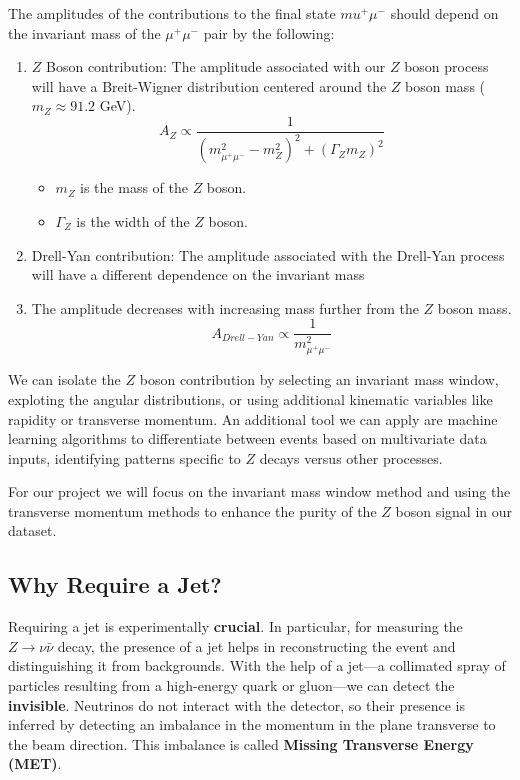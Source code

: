The amplitudes of the contributions to the final state \(mu^+ \mu^-\) should depend on the invariant mass of the $\mu^+ \mu^-$ pair by the following:
\begin{enumerate}
    \item $Z$ Boson contribution: The amplitude associated with our $Z$ boson process will have a Breit-Wigner distribution centered around the $Z$ boson mass ($m_Z \approx 91.2$ GeV).
    \begin{equation}
    A_{Z} \propto \frac{1}{(m^2_{\mu^+ \mu^-} - m^2_Z )^2 + (\Gamma_Z m_Z)^2} 
    \end{equation}
    \begin{itemize}[label=\(\ \star \)]
        \item $m_Z$ is the mass of the $Z$ boson.
        \item $\Gamma_Z$ is the width of the $Z$ boson.
    \end{itemize}
    \item Drell-Yan contribution: The amplitude associated with the Drell-Yan process will have a different dependence on the invariant mass
    \item The amplitude decreases with increasing mass further from the $Z$ boson mass.
    \begin{equation*}
        A_{Drell-Yan} \propto \frac{1}{m^2_{\mu^+ \mu^-}}
    \end{equation*}
\end{enumerate}

We can isolate the $Z$ boson contribution by selecting an invariant mass window, exploting the angular distributions, or using additional kinematic variables like rapidity or transverse momentum. An additional tool we can apply are machine learning algorithms to differentiate between events based on multivariate data inputs, identifying patterns specific to $Z$ decays versus other processes. 

For our project we will focus on the invariant mass window method and using the transverse momentum methods to enhance the purity of the $Z$ boson signal in our dataset.

\subsection{Why Require a Jet?}

Requiring a jet is experimentally \textbf{crucial}. In particular, for measuring the $Z \to \nu \bar{\nu}$ decay, the presence of a jet helps in reconstructing the event and distinguishing it from backgrounds. With the help of a jet---a collimated spray of particles resulting from a high-energy quark or gluon---we can detect the \textbf{invisible}. Neutrinos do not interact with the detector, so their presence is inferred by detecting an imbalance in the momentum in the plane transverse to the beam direction. This imbalance is called \textbf{Missing Transverse Energy (MET)}.

